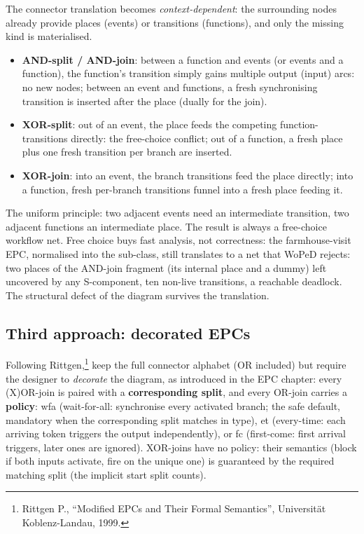 The connector translation becomes \emph{context-dependent}: the surrounding nodes already provide places (events) or transitions (functions), and only the missing kind is materialised.
\begin{itemize}
  \item \textbf{AND-split / AND-join}: between a function and events (or events and a function), the function's transition simply gains multiple output (input) arcs: no new nodes; between an event and functions, a fresh synchronising transition is inserted after the place (dually for the join).
  \item \textbf{XOR-split}: out of an event, the place feeds the competing function-transitions directly: the free-choice conflict; out of a function, a fresh place plus one fresh transition per branch are inserted.
  \item \textbf{XOR-join}: into an event, the branch transitions feed the place directly; into a function, fresh per-branch transitions funnel into a fresh place feeding it.
\end{itemize}
The uniform principle: two adjacent events need an intermediate transition, two adjacent functions an intermediate place. The result is always a free-choice workflow net. Free choice buys fast analysis, not correctness: the farmhouse-visit EPC, normalised into the sub-class, still translates to a net that WoPeD rejects: two places of the AND-join fragment (its internal place and a dummy) left uncovered by any S-component, ten non-live transitions, a reachable deadlock. The structural defect of the diagram survives the translation.

\subsection{Third approach: decorated EPCs}

Following Rittgen,\footnote{Rittgen P., ``Modified EPCs and Their Formal Semantics'', Universit\"at Koblenz-Landau, 1999.} keep the full connector alphabet (OR included) but require the designer to \emph{decorate} the diagram, as introduced in the EPC chapter: every (X)OR-join is paired with a \textbf{corresponding split}, and every OR-join carries a \textbf{policy}: \textsf{wfa} (wait-for-all: synchronise every activated branch; the safe default, mandatory when the corresponding split matches in type), \textsf{et} (every-time: each arriving token triggers the output independently), or \textsf{fc} (first-come: first arrival triggers, later ones are ignored). XOR-joins have no policy: their semantics (block if both inputs activate, fire on the unique one) is guaranteed by the required matching split (the implicit start split counts).

